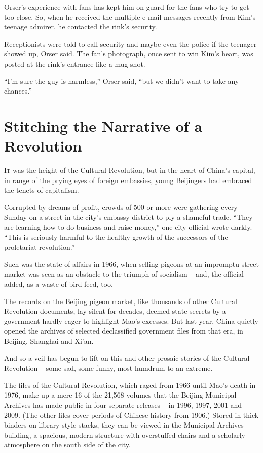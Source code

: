 ﻿\documentclass[12pt]{article}
\begin{document}
Orser's experience with fans has kept him on guard for the fans who try to get too close. So, when
he received the multiple e-mail messages recently from Kim's teenage admirer, he contacted the
rink's security.

Receptionists were told to call security and maybe even the police if the teenager showed up, Orser
said. The fan's photograph, once sent to win Kim's heart, was posted at the rink's entrance like a
mug shot.

``I'm sure the guy is harmless,'' Orser said, ``but we didn't want to take any chances.''

\section{Stitching the Narrative of a Revolution}

\lettrine{I}{t} was the height of the Cultural Revolution, but in the heart
of China's capital, in range of the prying eyes of foreign embassies, young Beijingers had embraced
the tenets of capitalism.


Corrupted by dreams of profit, crowds of 500 or more were gathering every Sunday on a street in the
city's embassy district to ply a shameful trade. ``They are learning how to do business and raise
money,'' one city official wrote darkly. ``This is seriously harmful to the healthy growth of the
successors of the proletariat revolution.''

Such was the state of affairs in 1966, when selling pigeons at an impromptu street market was seen
as an obstacle to the triumph of socialism -- and, the official added, as a waste of bird feed, too.

The records on the Beijing pigeon market, like thousands of other Cultural Revolution documents, lay
silent for decades, deemed state secrets by a government hardly eager to highlight Mao's excesses.
But last year, China quietly opened the archives of selected declassified government files from that
era, in Beijing, Shanghai and Xi'an.

And so a veil has begun to lift on this and other prosaic stories of the Cultural Revolution -- some
sad, some funny, most humdrum to an extreme.

The files of the Cultural Revolution, which raged from 1966 until Mao's death in 1976, make up a
mere 16 of the 21,568 volumes that the Beijing Municipal Archives has made public in four separate
releases -- in 1996, 1997, 2001 and 2009. (The other files cover periods of Chinese history from
1906.) Stored in thick binders on library-style stacks, they can be viewed in the Municipal Archives
building, a spacious, modern structure with overstuffed chairs and a scholarly atmosphere on the
south side of the city.
\end{document}
